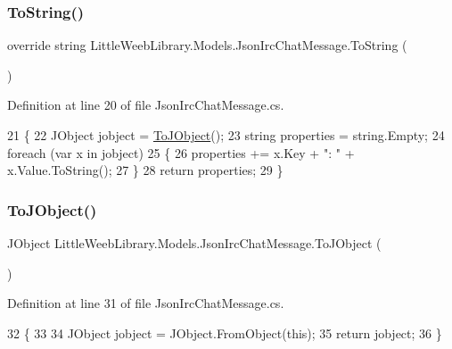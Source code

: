 \subsubsection{\texorpdfstring{To\+String()}{ToString()}}
{\footnotesize\ttfamily override string Little\+Weeb\+Library.\+Models.\+Json\+Irc\+Chat\+Message.\+To\+String (\begin{DoxyParamCaption}{ }\end{DoxyParamCaption})}



Definition at line 20 of file Json\+Irc\+Chat\+Message.\+cs.


\begin{DoxyCode}
21         \{
22             JObject jobject = \mbox{\hyperlink{class_little_weeb_library_1_1_models_1_1_json_irc_chat_message_a1f96ba6c751985a71f547d1e0dee171d}{ToJObject}}();
23             \textcolor{keywordtype}{string} properties = \textcolor{keywordtype}{string}.Empty;
24             \textcolor{keywordflow}{foreach} (var x \textcolor{keywordflow}{in} jobject)
25             \{
26                 properties += x.Key + \textcolor{stringliteral}{": "} + x.Value.ToString();
27             \}
28             \textcolor{keywordflow}{return} properties;
29         \}
\end{DoxyCode}
\mbox{\label{class_little_weeb_library_1_1_models_1_1_json_irc_chat_message_a1f96ba6c751985a71f547d1e0dee171d}} 
\subsubsection{\texorpdfstring{To\+J\+Object()}{ToJObject()}}
{\footnotesize\ttfamily J\+Object Little\+Weeb\+Library.\+Models.\+Json\+Irc\+Chat\+Message.\+To\+J\+Object (\begin{DoxyParamCaption}{ }\end{DoxyParamCaption})}



Definition at line 31 of file Json\+Irc\+Chat\+Message.\+cs.


\begin{DoxyCode}
32         \{
33 
34             JObject jobject = JObject.FromObject(\textcolor{keyword}{this});
35             \textcolor{keywordflow}{return} jobject;
36         \}
\end{DoxyCode}


